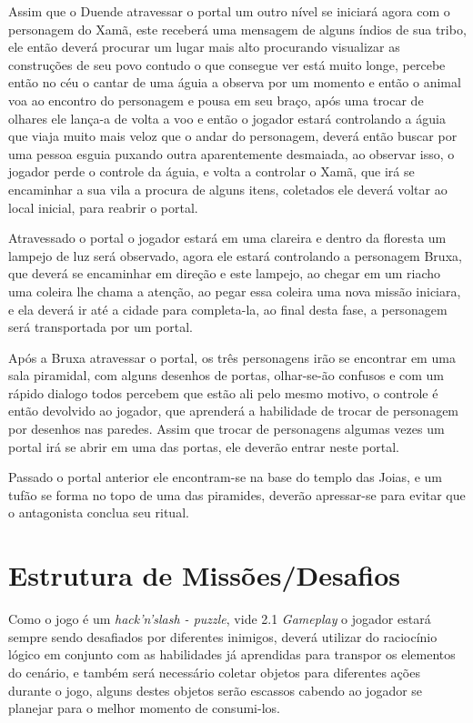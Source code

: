 Assim que o Duende atravessar o portal um outro nível se iniciará agora com o personagem do Xamã, este receberá uma mensagem de alguns índios de sua tribo, ele então deverá procurar um lugar mais alto procurando visualizar as construções de seu povo contudo o que consegue ver está muito longe, percebe então no céu o cantar de uma águia a observa por um momento e então o animal voa ao encontro do personagem e pousa em seu braço, após uma trocar de olhares ele lança-a de volta a voo e então o jogador estará controlando a águia que viaja muito mais veloz que o andar do personagem, deverá então buscar por uma pessoa esguia puxando outra aparentemente desmaiada, ao observar isso, o jogador perde o controle da águia, e volta a controlar o Xamã, que irá se encaminhar a sua vila a procura de alguns itens, coletados ele deverá voltar ao local inicial, para reabrir o portal.

Atravessado o portal o jogador estará em uma clareira e dentro da floresta um lampejo de luz será observado, agora ele estará controlando a personagem Bruxa, que deverá se encaminhar em direção e este lampejo, ao chegar em um riacho uma coleira lhe chama a atenção, ao pegar essa coleira uma nova missão iniciara, e ela deverá ir até a cidade para completa-la, ao final desta fase, a personagem será transportada por um portal.

Após a Bruxa atravessar o portal, os três personagens irão se encontrar em uma sala piramidal, com alguns desenhos de portas, olhar-se-ão confusos e com um rápido dialogo todos percebem que estão ali pelo mesmo motivo, o controle é então devolvido ao jogador, que aprenderá a habilidade de trocar de personagem por desenhos nas paredes. Assim que trocar de personagens algumas vezes um portal irá se abrir em uma das portas, ele deverão entrar neste portal.

Passado o portal anterior ele encontram-se na base do templo das Joias, e um tufão se forma no topo de uma das piramides, deverão apressar-se para evitar que o antagonista conclua seu ritual.


\section{Estrutura de Missões/Desafios}

Como o jogo é um \textit{hack'n'slash - puzzle}, vide 2.1 \textit{Gameplay} o jogador estará sempre sendo desafiados por diferentes inimigos, deverá utilizar do raciocínio lógico em conjunto com as habilidades já aprendidas para transpor os elementos do cenário, e também será necessário coletar objetos para diferentes ações durante o jogo, alguns destes objetos serão escassos cabendo ao jogador se planejar para o melhor momento de consumi-los.

